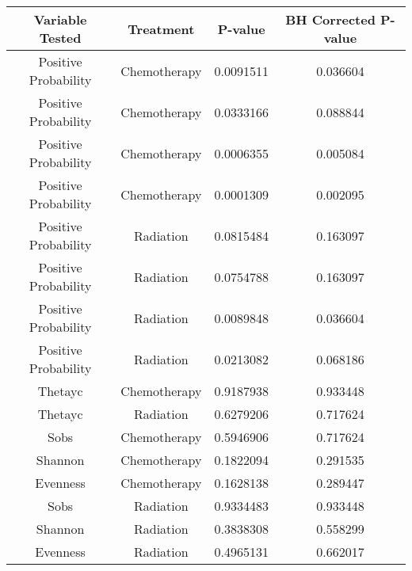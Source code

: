 \documentclass[12pt,]{article}
\begin{document}
\begin{longtable}[]{@{}cccc@{}}
\toprule
Variable Tested & Treatment & P-value & BH Corrected
P-value\tabularnewline
\midrule
\endhead
Positive Probability & Chemotherapy & 0.0091511 &
0.036604\tabularnewline
Positive Probability & Chemotherapy & 0.0333166 &
0.088844\tabularnewline
Positive Probability & Chemotherapy & 0.0006355 &
0.005084\tabularnewline
Positive Probability & Chemotherapy & 0.0001309 &
0.002095\tabularnewline
Positive Probability & Radiation & 0.0815484 & 0.163097\tabularnewline
Positive Probability & Radiation & 0.0754788 & 0.163097\tabularnewline
Positive Probability & Radiation & 0.0089848 & 0.036604\tabularnewline
Positive Probability & Radiation & 0.0213082 & 0.068186\tabularnewline
Thetayc & Chemotherapy & 0.9187938 & 0.933448\tabularnewline
Thetayc & Radiation & 0.6279206 & 0.717624\tabularnewline
Sobs & Chemotherapy & 0.5946906 & 0.717624\tabularnewline
Shannon & Chemotherapy & 0.1822094 & 0.291535\tabularnewline
Evenness & Chemotherapy & 0.1628138 & 0.289447\tabularnewline
Sobs & Radiation & 0.9334483 & 0.933448\tabularnewline
Shannon & Radiation & 0.3838308 & 0.558299\tabularnewline
Evenness & Radiation & 0.4965131 & 0.662017\tabularnewline
\bottomrule
\end{longtable}
\end{document}
